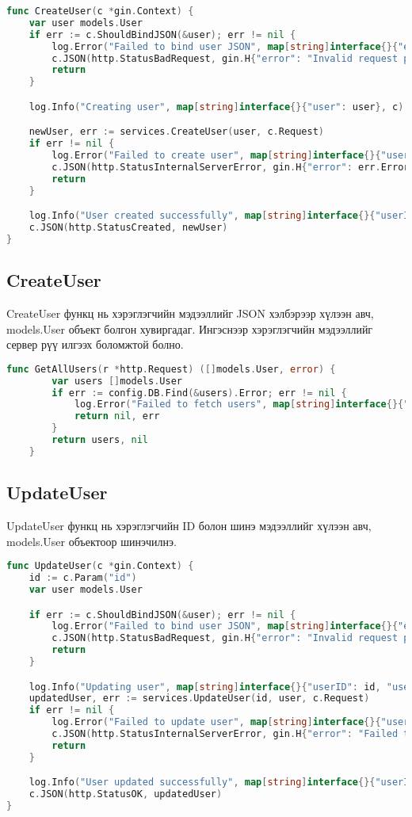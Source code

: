 \begin{lstlisting}[language=Go, caption=CreateUser Controller, frame=single]
	func CreateUser(c *gin.Context) {
	var user models.User
	if err := c.ShouldBindJSON(&user); err != nil {
		log.Error("Failed to bind user JSON", map[string]interface{}{"error": err.Error()}, c)
		c.JSON(http.StatusBadRequest, gin.H{"error": "Invalid request payload"})
		return
	}

	log.Info("Creating user", map[string]interface{}{"user": user}, c)

	newUser, err := services.CreateUser(user, c.Request)
	if err != nil {
		log.Error("Failed to create user", map[string]interface{}{"user": user, "error": err.Error()}, c)
		c.JSON(http.StatusInternalServerError, gin.H{"error": err.Error()})
		return
	}

	log.Info("User created successfully", map[string]interface{}{"userID": newUser.ID}, c)
	c.JSON(http.StatusCreated, newUser)
}
\end{lstlisting}

\subsection{CreateUser}
CreateUser функц нь хэрэглэгчийн мэдээллийг JSON хэлбэрээр хүлээн авч, models.User объект болгон хувиргадаг. Ингэснээр хэрэглэгчийн мэдээллийг сервер рүү илгээх боломжтой болно.
\begin{lstlisting}[language=Go, caption=CreatUser Controller, frame=single]
	func GetAllUsers(r *http.Request) ([]models.User, error) {
		var users []models.User
		if err := config.DB.Find(&users).Error; err != nil {
			log.Error("Failed to fetch users", map[string]interface{}{"error": err.Error()}, r)
			return nil, err
		}
		return users, nil
	}
\end{lstlisting}

\subsection{UpdateUser}
UpdateUser функц нь хэрэглэгчийн ID болон шинэ мэдээллийг хүлээн авч, models.User объектоор шинэчилнэ.
\begin{lstlisting}[language=Go, caption=UpdateUser Controller, frame=single]
	func UpdateUser(c *gin.Context) {
	id := c.Param("id")
	var user models.User

	if err := c.ShouldBindJSON(&user); err != nil {
		log.Error("Failed to bind user JSON", map[string]interface{}{"error": err.Error()}, c)
		c.JSON(http.StatusBadRequest, gin.H{"error": "Invalid request payload"})
		return
	}

	log.Info("Updating user", map[string]interface{}{"userID": id, "user": user}, c)
	updatedUser, err := services.UpdateUser(id, user, c.Request)
	if err != nil {
		log.Error("Failed to update user", map[string]interface{}{"userID": id, "error": err.Error()}, c)
		c.JSON(http.StatusInternalServerError, gin.H{"error": "Failed to update user"})
		return
	}

	log.Info("User updated successfully", map[string]interface{}{"userID": updatedUser.ID}, c)
	c.JSON(http.StatusOK, updatedUser)
}
\end{lstlisting}


